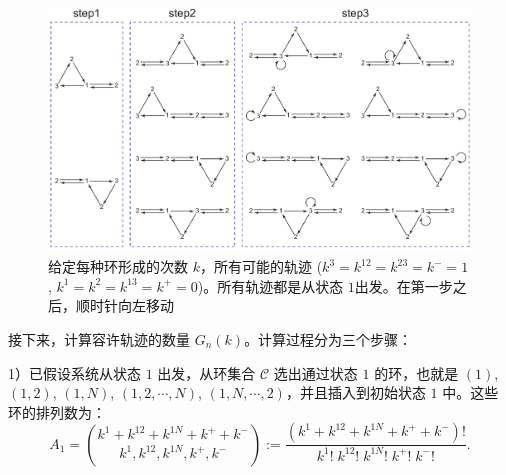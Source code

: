 \begin{figure}[htb!]
\centering
\includegraphics[scale=0.6]{chart/insertiongraph.pdf}
\caption{给定每种环形成的次数 $k$，所有可能的轨迹 ($k^3 = k^{12} = k^{23} = k^- = 1$, $k^1 = k^2 = k^{13} = k^+= 0$)。所有轨迹都是从状态 $1$出发。在第一步之后，顺时针向左移动}
\label{figure:insertion}
\end{figure}

接下来，计算容许轨迹的数量 $G_n(k)$。计算过程分为三个步骤：

1）已假设系统从状态 $1$ 出发，从环集合 $\mathcal{C}$ 选出通过状态 $1$ 的环，也就是 $(1)$, $(1,2)$, $(1,N)$, $(1,2,\cdots,N)$, $(1,N,\cdots,2)$，并且插入到初始状态 $1$ 中。这些环的排列数为：
\begin{equation*}\label{formula:A1}
    A_1 = \binom{k^1+k^{12}+k^{1N}+k^{+}+k^{-}}{k^1,k^{12},k^{1N},k^{+},k^{-}}
    := \frac{(k^1+k^{12}+k^{1N}+k^{+}+k^{-})!}{k^1!\;k^{12}!\;k^{1N}!\;k^{+}!\;k^{-}!}.
\end{equation*}


